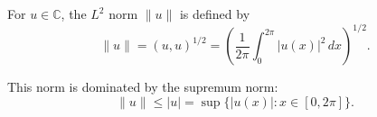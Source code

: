 For $u \in \mathbb{C}$, the $L^2$ norm $\|u\|$ is defined by
$$
\|u\| = (u, u)^{1/2} = \left( \frac{1}{2\pi} \int_{0}^{2\pi} |u(x)|^2 \, dx \right)^{1/2}.
$$

This norm is dominated by the supremum norm:
$$
\|u\| \leq |u| = \sup \{ |u(x)| : x \in [0, 2\pi] \}.
$$
